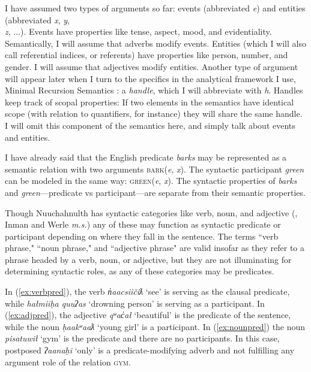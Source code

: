 I have assumed two types of arguments so far: events (abbreviated \textit{e}) and entities (abbreviated \textit{x}, \textit{y}, \\ \textit{z}, $\ldots$). Events have properties like tense, aspect, mood, and evidentiality. Semantically, I will assume that adverbs modify events. Entities (which I will also call referential indices, or referents) have properties like person, number, and gender. I will assume that adjectives modify entities. Another type of argument will appear later when I turn to the specifics in the analytical framework I use, Minimal Recursion Semantics \citep{copestake2005}: a \textit{handle}, which I will abbreviate with \textit{h}. Handles keep track of scopal properties: If two elements in the semantics have identical scope (with relation to quantifiers, for instance) they will share the same handle. I will omit this component of the semantics here, and simply talk about events and entities.

I have already said that the English predicate \textit{barks} may be represented as a semantic relation with two arguments \textsc{bark}(\textit{e}, \textit{x}). The syntactic participant \textit{green} can be modeled in the same way: \textsc{green}(\textit{e}, \textit{x}). The syntactic properties of \textit{barks} and \textit{green}---predicate vs participant---are separate from their semantic properties.

Though Nuuchahnulth has syntactic categories like verb, noun, and adjective (\citealt{jacobsen1979}, Inman and Werle \textit{m.s.}) any of these may function as syntactic predicate or participant depending on where they fall in the sentence. The terms ``verb phrase," ``noun phrase," and ``adjective phrase" are valid insofar as they refer to a phrase headed by a verb, noun, or adjective, but they are not illuminating for determining syntactic roles, as any of these categories may be predicates.

In (\ref{ex:verbpred}), the verb \textit{n̓aacsiičiƛ} `see' is serving as the clausal predicate, while \textit{hałmiiḥa quuʔas} `drowning person' is serving as a participant. In (\ref{ex:adjpred}), the adjective \textit{qʷac̓ał} `beautiful' is the predicate of the sentence, while the noun \textit{ḥaakʷaaƛ} `young girl' is a participant. In (\ref{ex:nounpred}) the noun \textit{pisatuwił} `gym' is the predicate and there are no participants. In this case, postposed \textit{ʔaanaḥi} `only' is a predicate-modifying adverb and not fulfilling any argument role of the relation \textsc{gym}.


